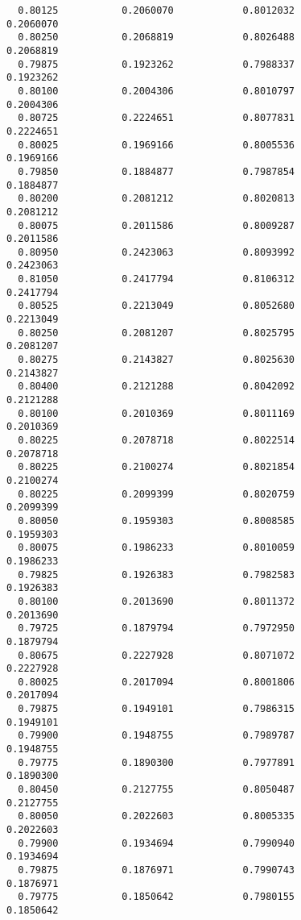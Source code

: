 \documentclass[
  letterpaper,
  DIV=11,
  numbers=noendperiod]{scrartcl}
\begin{document}
\begin{verbatim}
  0.80125           0.2060070            0.8012032            0.2060070     
  0.80250           0.2068819            0.8026488            0.2068819     
  0.79875           0.1923262            0.7988337            0.1923262     
  0.80100           0.2004306            0.8010797            0.2004306     
  0.80725           0.2224651            0.8077831            0.2224651     
  0.80025           0.1969166            0.8005536            0.1969166     
  0.79850           0.1884877            0.7987854            0.1884877     
  0.80200           0.2081212            0.8020813            0.2081212     
  0.80075           0.2011586            0.8009287            0.2011586     
  0.80950           0.2423063            0.8093992            0.2423063     
  0.81050           0.2417794            0.8106312            0.2417794     
  0.80525           0.2213049            0.8052680            0.2213049     
  0.80250           0.2081207            0.8025795            0.2081207     
  0.80275           0.2143827            0.8025630            0.2143827     
  0.80400           0.2121288            0.8042092            0.2121288     
  0.80100           0.2010369            0.8011169            0.2010369     
  0.80225           0.2078718            0.8022514            0.2078718     
  0.80225           0.2100274            0.8021854            0.2100274     
  0.80225           0.2099399            0.8020759            0.2099399     
  0.80050           0.1959303            0.8008585            0.1959303     
  0.80075           0.1986233            0.8010059            0.1986233     
  0.79825           0.1926383            0.7982583            0.1926383     
  0.80100           0.2013690            0.8011372            0.2013690     
  0.79725           0.1879794            0.7972950            0.1879794     
  0.80675           0.2227928            0.8071072            0.2227928     
  0.80025           0.2017094            0.8001806            0.2017094     
  0.79875           0.1949101            0.7986315            0.1949101     
  0.79900           0.1948755            0.7989787            0.1948755     
  0.79775           0.1890300            0.7977891            0.1890300     
  0.80450           0.2127755            0.8050487            0.2127755     
  0.80050           0.2022603            0.8005335            0.2022603     
  0.79900           0.1934694            0.7990940            0.1934694     
  0.79875           0.1876971            0.7990743            0.1876971     
  0.79775           0.1850642            0.7980155            0.1850642     

\end{verbatim}
\end{document}
